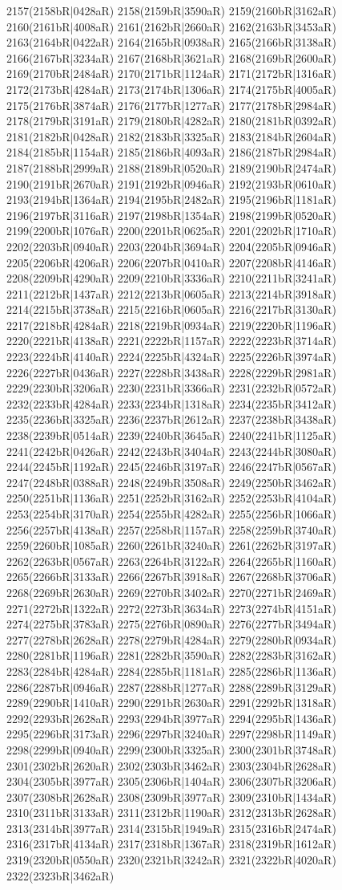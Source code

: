 2157(2158bR|0428aR) 2158(2159bR|3590aR) 2159(2160bR|3162aR) 2160(2161bR|4008aR) 2161(2162bR|2660aR) 2162(2163bR|3453aR) 2163(2164bR|0422aR) 2164(2165bR|0938aR) 2165(2166bR|3138aR) 2166(2167bR|3234aR) 2167(2168bR|3621aR) 2168(2169bR|2600aR) 2169(2170bR|2484aR) 2170(2171bR|1124aR) 2171(2172bR|1316aR) 2172(2173bR|4284aR) 2173(2174bR|1306aR) 2174(2175bR|4005aR) 2175(2176bR|3874aR) 2176(2177bR|1277aR) 2177(2178bR|2984aR) 2178(2179bR|3191aR) 2179(2180bR|4282aR) 2180(2181bR|0392aR) 2181(2182bR|0428aR) 2182(2183bR|3325aR) 2183(2184bR|2604aR) 2184(2185bR|1154aR) 2185(2186bR|4093aR) 2186(2187bR|2984aR) 2187(2188bR|2999aR) 2188(2189bR|0520aR) 2189(2190bR|2474aR) 2190(2191bR|2670aR) 2191(2192bR|0946aR) 2192(2193bR|0610aR) 2193(2194bR|1364aR) 2194(2195bR|2482aR) 2195(2196bR|1181aR) 2196(2197bR|3116aR) 2197(2198bR|1354aR) 2198(2199bR|0520aR) 2199(2200bR|1076aR) 2200(2201bR|0625aR) 2201(2202bR|1710aR) 2202(2203bR|0940aR) 2203(2204bR|3694aR) 2204(2205bR|0946aR) 2205(2206bR|4206aR) 2206(2207bR|0410aR) 2207(2208bR|4146aR) 2208(2209bR|4290aR) 2209(2210bR|3336aR) 2210(2211bR|3241aR) 2211(2212bR|1437aR) 2212(2213bR|0605aR) 2213(2214bR|3918aR) 2214(2215bR|3738aR) 2215(2216bR|0605aR) 2216(2217bR|3130aR) 2217(2218bR|4284aR) 2218(2219bR|0934aR) 2219(2220bR|1196aR) 2220(2221bR|4138aR) 2221(2222bR|1157aR) 2222(2223bR|3714aR) 2223(2224bR|4140aR) 2224(2225bR|4324aR) 2225(2226bR|3974aR) 2226(2227bR|0436aR) 2227(2228bR|3438aR) 2228(2229bR|2981aR) 2229(2230bR|3206aR) 2230(2231bR|3366aR) 2231(2232bR|0572aR) 2232(2233bR|4284aR) 2233(2234bR|1318aR) 2234(2235bR|3412aR) 2235(2236bR|3325aR) 2236(2237bR|2612aR) 2237(2238bR|3438aR) 2238(2239bR|0514aR) 2239(2240bR|3645aR) 2240(2241bR|1125aR) 2241(2242bR|0426aR) 2242(2243bR|3404aR) 2243(2244bR|3080aR) 2244(2245bR|1192aR) 2245(2246bR|3197aR) 2246(2247bR|0567aR) 2247(2248bR|0388aR) 2248(2249bR|3508aR) 2249(2250bR|3462aR) 2250(2251bR|1136aR) 2251(2252bR|3162aR) 2252(2253bR|4104aR) 2253(2254bR|3170aR) 2254(2255bR|4282aR) 2255(2256bR|1066aR) 2256(2257bR|4138aR) 2257(2258bR|1157aR) 2258(2259bR|3740aR) 2259(2260bR|1085aR) 2260(2261bR|3240aR) 2261(2262bR|3197aR) 2262(2263bR|0567aR) 2263(2264bR|3122aR) 2264(2265bR|1160aR) 2265(2266bR|3133aR) 2266(2267bR|3918aR) 2267(2268bR|3706aR) 2268(2269bR|2630aR) 2269(2270bR|3402aR) 2270(2271bR|2469aR) 2271(2272bR|1322aR) 2272(2273bR|3634aR) 2273(2274bR|4151aR) 2274(2275bR|3783aR) 2275(2276bR|0890aR) 2276(2277bR|3494aR) 2277(2278bR|2628aR) 2278(2279bR|4284aR) 2279(2280bR|0934aR) 2280(2281bR|1196aR) 2281(2282bR|3590aR) 2282(2283bR|3162aR) 2283(2284bR|4284aR) 2284(2285bR|1181aR) 2285(2286bR|1136aR) 2286(2287bR|0946aR) 2287(2288bR|1277aR) 2288(2289bR|3129aR) 2289(2290bR|1410aR) 2290(2291bR|2630aR) 2291(2292bR|1318aR) 2292(2293bR|2628aR) 2293(2294bR|3977aR) 2294(2295bR|1436aR) 2295(2296bR|3173aR) 2296(2297bR|3240aR) 2297(2298bR|1149aR) 2298(2299bR|0940aR) 2299(2300bR|3325aR) 2300(2301bR|3748aR) 2301(2302bR|2620aR) 2302(2303bR|3462aR) 2303(2304bR|2628aR) 2304(2305bR|3977aR) 2305(2306bR|1404aR) 2306(2307bR|3206aR) 2307(2308bR|2628aR) 2308(2309bR|3977aR) 2309(2310bR|1434aR) 2310(2311bR|3133aR) 2311(2312bR|1190aR) 2312(2313bR|2628aR) 2313(2314bR|3977aR) 2314(2315bR|1949aR) 2315(2316bR|2474aR) 2316(2317bR|4134aR) 2317(2318bR|1367aR) 2318(2319bR|1612aR) 2319(2320bR|0550aR) 2320(2321bR|3242aR) 2321(2322bR|4020aR) 2322(2323bR|3462aR) 